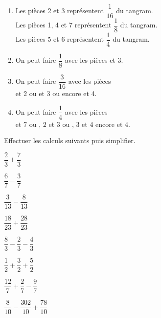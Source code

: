 \begin{colonne*exercice}
\begin{corrige}
\ \\ [-5mm]
   \begin{enumerate}
      \item Les pièces 2 et 3 représentent {\blue $\dfrac{1}{16}$} du tangram. \\ \smallskip
         Les pièces 1, 4 et 7 représentent {\blue $\dfrac18$} du tangram. \\ \smallskip
         Les pièces 5 et 6 représentent {\blue $\dfrac14$} du tangram. \medskip
      \item On peut faire $\dfrac18$ avec les pièces { et 3}. \medskip
      \item On peut faire $\dfrac{3}{16}$ avec les pièces \\ [1mm]
         { et 2} ou { et 3} ou encore { et 4}. \medskip
      \item On peut faire $\dfrac14$ avec les pièces \\ [1mm]
         { et 7} ou {, 2 et 3} ou {, 3 et 4} encore { et 4}.
   \end{enumerate}
\end{corrige}

\bigskip


\begin{exercice} %
   Effectuer les calculs suivants puis simplifier. \medskip
   \begin{colenumerate}{2}
      \item $\dfrac23+\dfrac73$ \medskip
      \item $\dfrac67-\dfrac37$ \medskip
      \item $\dfrac3{13}-\dfrac8{13}$ \medskip
      \item $\dfrac{18}{23}+\dfrac{28}{23}$
      \item $\dfrac83-\dfrac23-\dfrac43$ 
      \item $\dfrac12+\dfrac32+\dfrac52$
      \item $\dfrac{12}7+\dfrac27-\dfrac97$
      \item $\dfrac8{10}-\dfrac{302}{10}+\dfrac{78}{10}$
   \end{colenumerate}
\end{exercice}


\end{colonne*exercice}

